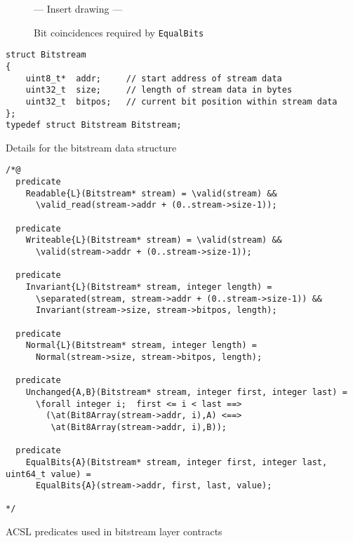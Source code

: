 \begin{figure}
\begin{center}
\vspace*{2cm}
--- Insert drawing ---
\vspace*{2cm}
\caption{\label{fig:EqualBits correspondance}
	Bit coincidences required by \lstinline{EqualBits}}
\end{center}
\end{figure}




\begin{listing}[hbt]
\begin{minipage}{0.99\textwidth}
\begin{lstlisting}[style=acsl-block]
struct Bitstream
{
    uint8_t*  addr;     // start address of stream data
    uint32_t  size;     // length of stream data in bytes
    uint32_t  bitpos;   // current bit position within stream data
};
typedef struct Bitstream Bitstream;
\end{lstlisting}
\end{minipage}
\caption{\label{lst:Bitstream struct}
	Details for the bitstream data structure}
\end{listing}





\begin{listing}[hbt]
\begin{minipage}{0.99\textwidth}
\begin{lstlisting}[style=acsl-block]
/*@
  predicate 
    Readable{L}(Bitstream* stream) = \valid(stream) &&
      \valid_read(stream->addr + (0..stream->size-1));

  predicate
    Writeable{L}(Bitstream* stream) = \valid(stream) &&
      \valid(stream->addr + (0..stream->size-1));

  predicate
    Invariant{L}(Bitstream* stream, integer length) =
      \separated(stream, stream->addr + (0..stream->size-1)) &&
      Invariant(stream->size, stream->bitpos, length);

  predicate
    Normal{L}(Bitstream* stream, integer length) =
      Normal(stream->size, stream->bitpos, length);

  predicate
    Unchanged{A,B}(Bitstream* stream, integer first, integer last) =
      \forall integer i;  first <= i < last ==>
        (\at(Bit8Array(stream->addr, i),A) <==>
         \at(Bit8Array(stream->addr, i),B));

  predicate
    EqualBits{A}(Bitstream* stream, integer first, integer last, uint64_t value) =
      EqualBits{A}(stream->addr, first, last, value);

*/
\end{lstlisting}
\end{minipage}
\caption{\label{lst:Bitstream preds}
	ACSL predicates used in bitstream layer contracts}
\end{listing}




